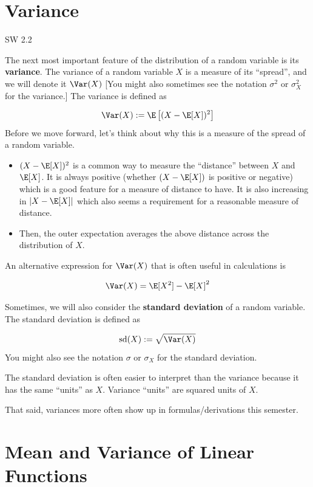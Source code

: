 \documentclass[
  letterpaper,
  DIV=11,
  numbers=noendperiod]{scrreprt}
\begin{document}
\section{Variance}\label{variance}

SW 2.2

The next most important feature of the distribution of a random variable
is its \textbf{variance}. The variance of a random variable \(X\) is a
measure of its ``spread'', and we will denote it \(\Var(X)\) {[}You
might also sometimes see the notation \(\sigma^2\) or \(\sigma_X^2\) for
the variance.{]} The variance is defined as

\[
  \Var(X) := \E\left[ (X - \E[X])^2 \right]
\] Before we move forward, let's think about why this is a measure of
the spread of a random variable.

\begin{itemize}
\item
  \((X-\E[X])^2\) is a common way to measure the ``distance'' between
  \(X\) and \(\E[X]\). It is always positive (whether \((X - \E[X])\) is
  positive or negative) which is a good feature for a measure of
  distance to have. It is also increasing in \(|X-\E[X]|\) which also
  seems a requirement for a reasonable measure of distance.
\item
  Then, the outer expectation averages the above distance across the
  distribution of \(X\).
\end{itemize}

An alternative expression for \(\Var(X)\) that is often useful in
calculations is

\[
  \Var(X) = \E[X^2] - \E[X]^2
\]

Sometimes, we will also consider the \textbf{standard deviation} of a
random variable. The standard deviation is defined as

\[
  \textrm{sd}(X) := \sqrt{\Var(X)}
\] You might also see the notation \(\sigma\) or \(\sigma_X\) for the
standard deviation.

The standard deviation is often easier to interpret than the variance
because it has the same ``units'' as \(X\). Variance ``units'' are
squared units of \(X\).

That said, variances more often show up in formulas/derivations this
semester.

\section{Mean and Variance of Linear
Functions}\label{mean-and-variance-of-linear-functions}
\end{document}
